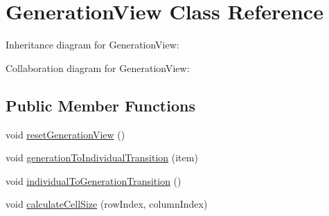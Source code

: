 \hypertarget{class_generation_view}{}\section{Generation\+View Class Reference}
\label{class_generation_view}


Inheritance diagram for Generation\+View\+:


Collaboration diagram for Generation\+View\+:
\subsection*{Public Member Functions}
\begin{DoxyCompactItemize}
\item 
void \hyperlink{class_generation_view_a3d76cb7eb28d72ae202474c0a991ae36}{reset\+Generation\+View} ()
\item 
void \hyperlink{class_generation_view_a866d1e3d016ea4ffc63da28791670171}{generation\+To\+Individual\+Transition} (item)
\item 
void \hyperlink{class_generation_view_ac5edb6d79f32d5dd3108e3d069e06ea9}{individual\+To\+Generation\+Transition} ()
\item 
void \hyperlink{class_generation_view_abd80b9783934a10769cfdd193494afcf}{calculate\+Cell\+Size} (row\+Index, column\+Index)
\end{DoxyCompactItemize}
